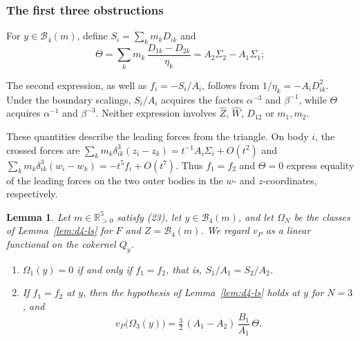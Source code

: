 \documentclass[11pt]{amsart}
\newenvironment{alphalist}{\begin{enumerate}\renewcommand{\labelenumi}{(\alph{enumi})}%
  \renewcommand{\theenumi}{\alph{enumi}}}{\end{enumerate}}
\newtheorem{lemma}[theorem]{Lemma}
\theoremstyle{definition}
\theoremstyle{remark}
\newcommand{\Rp}{\mathbb{R}_{>0}}
\begin{document}
\subsubsection{The first three obstructions}\label{d4-obstructions}
{For $y\in\mathcal B_4(m)$, define $S_i=\sum_km_kD_{ik}$ and}
\[
  \Theta=\sum_km_k\,\frac{D_{1k}-D_{2k}}{\eta_k}=A_2\Sigma_2-A_1\Sigma_1 ;
\]
{The second expression, as well as $f_i=-S_i/A_i$, follows from
$1/\eta_k=-A_iD_{ik}^2$. Under the boundary scalings, $S_i/A_i$ acquires the factors
$\alpha^{-3}$ and $\beta^{-1}$, while $\Theta$ acquires $\alpha^{-1}$ and $\beta^{-3}$.
Neither expression involves $\hat Z$, $\hat W$, $D_{12}$ or $m_1,m_2$.

These quantities describe the leading forces from the triangle.
On body $i$, the crossed forces are $\sum_km_k\delta_{ik}^3(z_i-z_k)=t^{-1}A_i\Sigma_i+O(t^2)$
and $\sum_km_k\delta_{ik}^3(w_i-w_k)=-t^5f_i+O(t^7)$.
Thus $f_1=f_2$ and $\Theta=0$ express equality of the leading forces on the two outer bodies
in the $w$- and $z$-coordinates, respectively.}

\begin{lemma}\label{lem:d4-obstr}
Let $m\in\Rp^5$ satisfy (23), let $y\in\mathcal B_4(m)$, and let $\Omega_N$ be the classes of
Lemma~\ref{lem:d4-ls} for $F$ and $Z=\mathcal B_4(m)$.
{We regard $v_P$ as a linear functional on the cokernel $Q_y$.}
\begin{alphalist}
  \item $\Omega_1(y)=0$ if and only if $f_1=f_2$, that is, $S_1/A_1=S_2/A_2$.
  \item If $f_1=f_2$ at $y$, then the hypothesis of Lemma~\ref{lem:d4-ls} holds at $y$ for
  $N=3$, and
  \[
    v_P\big(\Omega_3(y)\big)=\tfrac32\,(A_1-A_2)\,\frac{B_1}{A_1}\,\Theta .
  \]
\end{alphalist}
\end{lemma}
\end{document}
